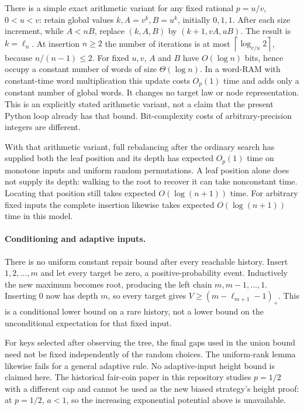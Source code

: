 \documentclass[11pt]{article}
\newcommand{\ceil}[1]{\left\lceil #1\right\rceil}
\begin{document}
There is a simple exact arithmetic variant for any fixed rational $p=u/v$,
$0<u<v$: retain global values $k,A=v^k,B=u^k$, initially $0,1,1$. After each
size increment, while $A<nB$, replace $(k,A,B)$ by $(k+1,vA,uB)$. The result is
$k=\ell_n$. At insertion $n\ge2$ the number of iterations is at most
$\ceil{\log_{v/u}2}$, because $n/(n-1)\le2$. For fixed $u,v$, $A$ and $B$
have $O(\log n)$ bits, hence occupy a constant number of words of size
$\Theta(\log n)$. In a word-RAM with constant-time word multiplication this
update costs $O_p(1)$ time and adds only a constant number of global words.
It changes no target law or node representation. This is an explicitly stated
arithmetic variant, not a claim that the present Python loop already has that
bound. Bit-complexity costs of arbitrary-precision integers are different.

With that arithmetic variant, full rebalancing after the ordinary search has
supplied both the leaf position and its depth has expected $O_p(1)$ time on
monotone inputs and uniform random permutations. A leaf position alone does not
supply its depth: walking to the root to recover it can take nonconstant time.
Locating that position still takes expected $O(\log(n+1))$ time. For arbitrary
fixed inputs the complete insertion likewise takes expected $O(\log(n+1))$
time in this model.

\paragraph{Conditioning and adaptive inputs.}
There is no uniform constant repair bound after every reachable history.
Insert $1,2,\ldots,m$ and let every target be zero, a positive-probability event.
Inductively the new maximum becomes root, producing the left chain
$m,m-1,\ldots,1$. Inserting $0$ now has depth $m$, so every target gives
$V\ge(m-\ell_{m+1}-1)_+$. This is a conditional lower bound on a rare history,
not a lower bound on the unconditional expectation for that fixed input.

For keys selected after observing the tree, the final gaps used in the union
bound need not be fixed independently of the random choices. The uniform-rank
lemma likewise fails for a general adaptive rule. No adaptive-input height
bound is claimed here. The historical fair-coin paper in this repository
studies $p=1/2$ with a different cap and cannot be used as the new biased
strategy's height proof: at $p=1/2$, $a<1$, so the increasing exponential
potential above is unavailable.
\end{document}
